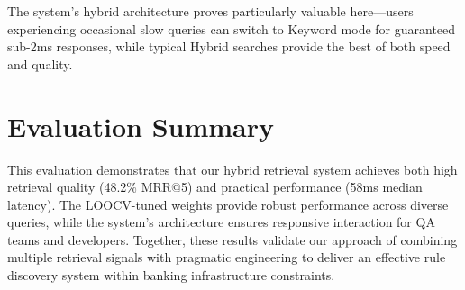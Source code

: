 The system's hybrid architecture proves particularly valuable here—users experiencing occasional slow queries can switch to Keyword mode for guaranteed sub-2ms responses, while typical Hybrid searches provide the best of both speed and quality.

\section{Evaluation Summary}

This evaluation demonstrates that our hybrid retrieval system achieves both high retrieval quality (48.2\% MRR@5) and practical performance (58ms median latency). The LOOCV-tuned weights provide robust performance across diverse queries, while the system's architecture ensures responsive interaction for QA teams and developers. Together, these results validate our approach of combining multiple retrieval signals with pragmatic engineering to deliver an effective rule discovery system within banking infrastructure constraints.

